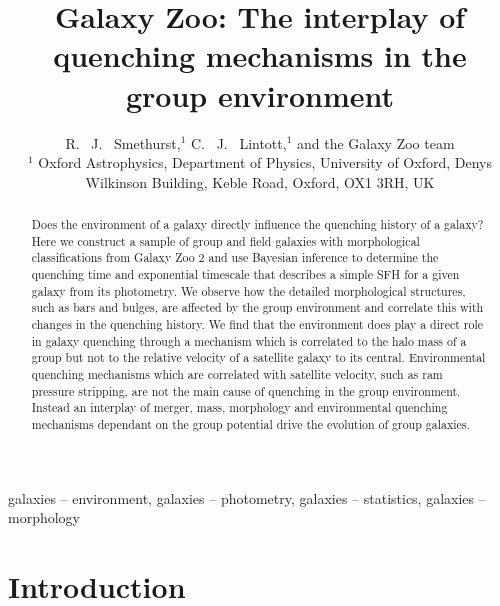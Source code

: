 \documentclass[useAMS,usenatbib]{mn2e}
\begin{document}
\title[Group environment quenching mechanisms]{Galaxy Zoo: The interplay of quenching mechanisms in the group environment}
\author[Smethurst et al. 2015]{R. ~J. ~Smethurst,$^{1}$ C. ~J. ~Lintott,$^{1}$ and the Galaxy Zoo team \footnotemark[1]
\\ $^1$ Oxford Astrophysics, Department of Physics, University of Oxford, Denys Wilkinson Building, Keble Road, Oxford, OX1 3RH, UK 
}

\maketitle

\begin{abstract}
Does the environment of a galaxy directly influence the quenching history of a galaxy? Here we construct a sample of group and field galaxies with morphological classifications from Galaxy Zoo 2 and use Bayesian inference to determine the quenching time and exponential timescale that describes a simple SFH for a given galaxy from its photometry. We observe how the detailed morphological structures, such as bars and bulges, are affected by the group environment and correlate this with changes in the quenching history.  We find that the environment does play a direct role in galaxy quenching through a mechanism which is correlated to the halo mass of a group but not to the relative velocity of a satellite galaxy to its central. Environmental quenching mechanisms which are correlated with satellite velocity, such as ram pressure stripping, are not the main cause of quenching in the group environment. Instead an interplay of merger, mass, morphology and environmental quenching mechanisms dependant on the group potential drive the evolution of group galaxies. 

\end{abstract}

\begin{keywords}
galaxies -- environment, galaxies -- photometry, galaxies -- statistics, galaxies -- morphology
\end{keywords}


\section{Introduction}\label{sec:intro}
 
\end{document}
